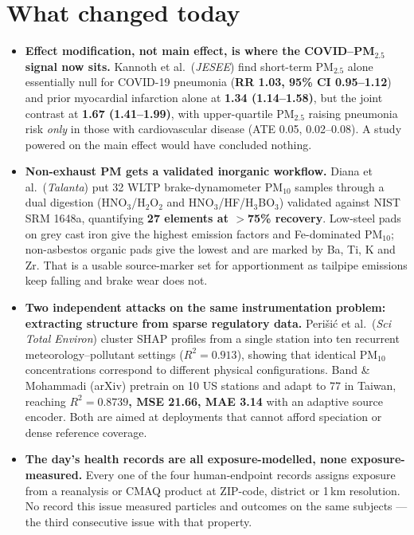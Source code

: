 \documentclass[10pt]{article}
\begin{document}
\section*{\sffamily\bfseries\color{Deep}What changed today}
\vspace{-1.5mm}{\color{Amber}\rule{\linewidth}{1.1pt}}\vspace{2.5mm}

\footnotesize
\begin{itemize}
\item \textbf{Effect modification, not main effect, is where the COVID--PM$_{2.5}$ signal
now sits.} Kannoth et al.\ (\textit{JESEE}) find short-term PM$_{2.5}$ alone essentially
null for COVID-19 pneumonia (\textbf{RR 1.03, 95\% CI 0.95--1.12}) and prior myocardial
infarction alone at \textbf{1.34 (1.14--1.58)}, but the joint contrast at
\textbf{1.67 (1.41--1.99)}, with upper-quartile PM$_{2.5}$ raising pneumonia risk
\emph{only} in those with cardiovascular disease (ATE 0.05, 0.02--0.08). A study powered on
the main effect would have concluded nothing.

\item \textbf{Non-exhaust PM gets a validated inorganic workflow.} Diana et al.\
(\textit{Talanta}) put 32 WLTP brake-dynamometer PM$_{10}$ samples through a dual digestion
(HNO$_3$/H$_2$O$_2$ and HNO$_3$/HF/H$_3$BO$_3$) validated against NIST SRM 1648a,
quantifying \textbf{27 elements at $>$75\% recovery}. Low-steel pads on grey cast iron give
the highest emission factors and Fe-dominated PM$_{10}$; non-asbestos organic pads give the
lowest and are marked by Ba, Ti, K and Zr. That is a usable source-marker set for
apportionment as tailpipe emissions keep falling and brake wear does not.

\item \textbf{Two independent attacks on the same instrumentation problem: extracting
structure from sparse regulatory data.} Peri\v{s}i\'c et al.\ (\textit{Sci Total Environ})
cluster SHAP profiles from a single station into ten recurrent
meteorology--pollutant settings ($R^2 = 0.913$), showing that identical PM$_{10}$
concentrations correspond to different physical configurations. Band \& Mohammadi (arXiv)
pretrain on 10 US stations and adapt to 77 in Taiwan, reaching \textbf{$R^2 = 0.8739$,
MSE 21.66, MAE 3.14} with an adaptive source encoder. Both are aimed at deployments that
cannot afford speciation or dense reference coverage.

\item \textbf{The day's health records are all exposure-modelled, none exposure-measured.}
Every one of the four human-endpoint records assigns exposure from a reanalysis or CMAQ
product at ZIP-code, district or 1\,km resolution. No record this issue measured particles
and outcomes on the same subjects --- the third consecutive issue with that property.


\end{itemize}
\end{document}

